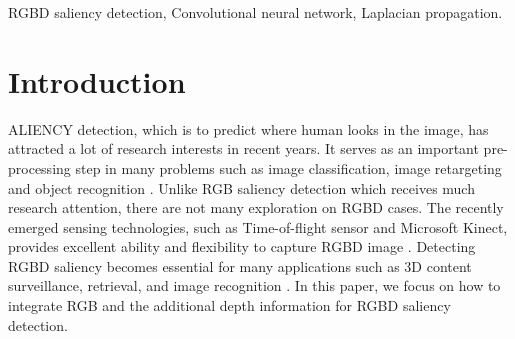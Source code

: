 \documentclass[journal]{IEEEtran}
\begin{document}
\begin{IEEEkeywords}
RGBD saliency detection, Convolutional neural network, Laplacian propagation.
\end{IEEEkeywords}






\IEEEpeerreviewmaketitle



\section{Introduction}
ALIENCY detection, which is to predict where human looks in the image,
has attracted a lot of research interests in recent years. It serves as an important pre-processing step
in many problems such as image classification, image retargeting and
object recognition \cite{rutishauser2004bottom,mahadevan2009saliency,sharma2012discriminative,luo2014switchable}.
Unlike RGB saliency detection which receives much research attention, there are not many exploration on RGBD cases. The recently emerged sensing technologies, such as Time-of-flight sensor and Microsoft Kinect, provides excellent ability and flexibility to capture RGBD image \cite{zhang2012microsoft,gokturk2004time}.
Detecting RGBD saliency becomes essential for many applications such as 3D content surveillance, retrieval, and image recognition \cite{mishra2012segmenting,fu2015object,banica2015second}. In this paper, we focus on how to integrate RGB and the additional depth information for RGBD saliency detection.
\end{document}
